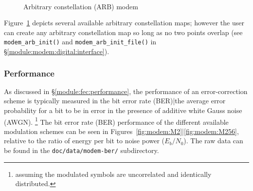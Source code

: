 %
\begin{figure}
\centering
\mbox{
   \quad
   \quad
}
\mbox{
   \quad
   \quad
}
\caption{Arbitrary constellation (ARB) modem}
\label{fig:modem:arb}
\end{figure}
%
Figure~\ref{fig:modem:arb} depicts several available arbitrary
constellation maps;
however the user can create any arbitrary constellation map so long as
no two points overlap
(see {\tt modem\_arb\_init()} and {\tt modem\_arb\_init\_file()} in
\S\ref{module:modem:digital:interface}).

\subsubsection{Performance}
\label{module:modem:digital:performance}

As discussed in \S\ref{module:fec:performance},
the performance of an error-correction scheme is typically measured in
the bit error rate (BER)|the average error probability for a bit to be
in error in the presence of additive white Gauss noise (AWGN).%
\footnote{assuming the modulated symbols are uncorrelated and
          identically distributed.}
The bit error rate (BER) performance of the different available
modulation schemes can be seen in
Figures~\ref{fig:modem:M2}|\ref{fig:modem:M256}, relative to the ratio
of energy per bit to noise power ($E_b/N_0$).
The raw data can be found in the {\tt doc/data/modem-ber/}
subdirectory.

